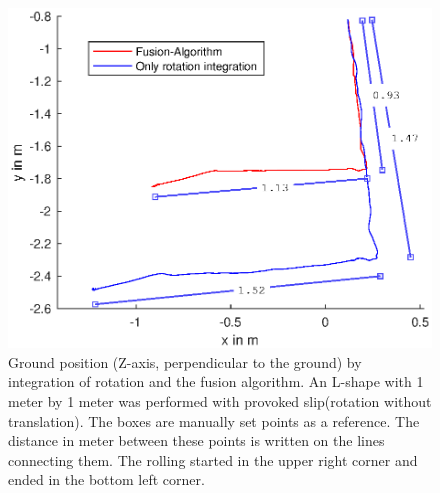 \documentclass[letterpaper, 10 pt, conference]{ieeeconf}  %
\begin{document}
\begin{figure}
\includegraphics[width=\linewidth]{./graphics/LTest.eps}
\caption{Ground position (Z-axis, perpendicular to the ground) by integration of rotation and the fusion algorithm. An L-shape with 1 meter by 1 meter was performed with provoked slip(rotation without translation). The boxes are manually set points as a reference. The distance in meter between these points is written on the lines connecting them. The rolling started in the upper right corner and ended in the bottom left corner. }
\label{LTest}
\end{figure}
\end{document}
